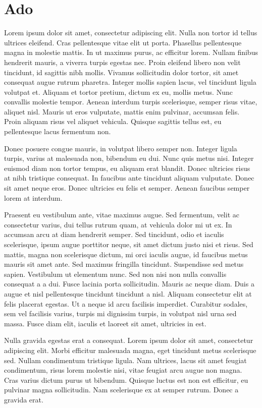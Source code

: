 \chapter{Ado}

Lorem ipsum dolor sit amet, consectetur adipiscing elit. Nulla non tortor id tellus ultrices eleifend. Cras pellentesque vitae elit ut porta. Phasellus pellentesque magna in molestie mattis. In ut maximus purus, ac efficitur lorem. Nullam finibus hendrerit mauris, a viverra turpis egestas nec. Proin eleifend libero non velit tincidunt, id sagittis nibh mollis. Vivamus sollicitudin dolor tortor, sit amet consequat augue rutrum pharetra. Integer mollis sapien lacus, vel tincidunt ligula volutpat et. Aliquam et tortor pretium, dictum ex eu, mollis metus. Nunc convallis molestie tempor. Aenean interdum turpis scelerisque, semper risus vitae, aliquet nisl. Mauris ut eros vulputate, mattis enim pulvinar, accumsan felis. Proin aliquam risus vel aliquet vehicula. Quisque sagittis tellus est, eu pellentesque lacus fermentum non.

Donec posuere congue mauris, in volutpat libero semper non. Integer ligula turpis, varius at malesuada non, bibendum eu dui. Nunc quis metus nisi. Integer euismod diam non tortor tempus, eu aliquam erat blandit. Donec ultricies risus at nibh tristique consequat. In faucibus ante tincidunt aliquam vulputate. Donec sit amet neque eros. Donec ultricies eu felis et semper. Aenean faucibus semper lorem at interdum.

Praesent eu vestibulum ante, vitae maximus augue. Sed fermentum, velit ac consectetur varius, dui tellus rutrum quam, at vehicula dolor mi ut ex. In accumsan arcu at diam hendrerit semper. Sed tincidunt, odio et iaculis scelerisque, ipsum augue porttitor neque, sit amet dictum justo nisi et risus. Sed mattis, magna non scelerisque dictum, mi orci iaculis augue, id faucibus metus mauris sit amet ante. Sed maximus fringilla tincidunt. Suspendisse sed metus sapien. Vestibulum ut elementum nunc. Sed non nisi non nulla convallis consequat a a dui. Fusce lacinia porta sollicitudin. Mauris ac neque diam. Duis a augue et nisl pellentesque tincidunt tincidunt a nisl. Aliquam consectetur elit at felis placerat egestas. Ut a neque id arcu facilisis imperdiet. Curabitur sodales, sem vel facilisis varius, turpis mi dignissim turpis, in volutpat nisl urna sed massa. Fusce diam elit, iaculis et laoreet sit amet, ultricies in est.

Nulla gravida egestas erat a consequat. Lorem ipsum dolor sit amet, consectetur adipiscing elit. Morbi efficitur malesuada magna, eget tincidunt metus scelerisque sed. Nullam condimentum tristique ligula. Nam ultrices, lacus sit amet feugiat condimentum, risus lorem molestie nisi, vitae feugiat arcu augue non magna. Cras varius dictum purus ut bibendum. Quisque luctus est non est efficitur, eu pulvinar magna sollicitudin. Nam scelerisque ex at semper rutrum. Donec a gravida erat.

